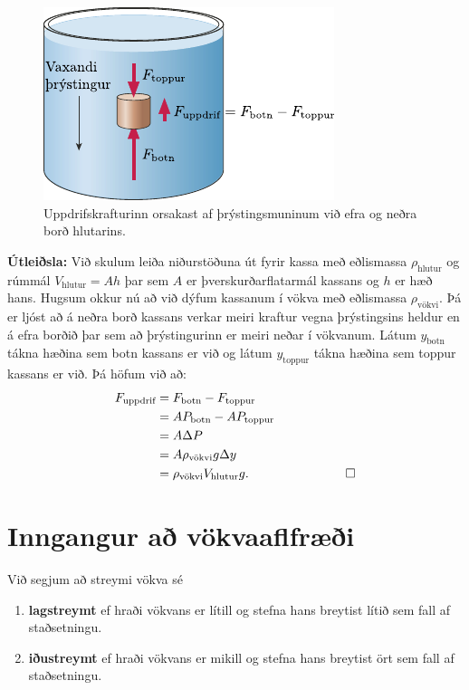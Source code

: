 \ifdefined \wholebook \else\documentclass[oneside]{book}\usepackage{EdlBook}\graphicspath{{figures/}}
\begin{document}
\begin{minipage}{\linewidth}
\begin{figure}
    \centering
    \includegraphics{figures/uppdrif.pdf}
    \caption{Uppdrifskrafturinn orsakast af þrýstingsmuninum við efra og neðra borð hlutarins.}
    \label{fig:uppdrif}
\end{figure}

\textbf{Útleiðsla:} Við skulum leiða niðurstöðuna út fyrir kassa með eðlismassa $\rho_{\text{hlutur}}$ og rúmmál $V_{\text{hlutur}} = Ah$ þar sem $A$ er þverskurðarflatarmál kassans og $h$ er hæð hans. Hugsum okkur nú að við dýfum kassanum í vökva með eðlismassa $\rho_{\text{vökvi}}$. Þá er ljóst að á neðra borð kassans verkar meiri kraftur vegna þrýstingsins heldur en á efra borðið þar sem að þrýstingurinn er meiri neðar í vökvanum. Látum $y_{\text{botn}}$ tákna hæðina sem botn kassans er við og látum $y_{\text{toppur}}$ tákna hæðina sem toppur kassans er við. Þá höfum við að:
\begin{align*}
    F_{\text{uppdrif}} &= F_{\text{botn}} - F_{\text{toppur}} \\
    &= AP_{\text{botn}} - AP_{\text{toppur}} \\
    &= A \Delta P \\
    &= A \rho_{\text{vökvi}}g\Delta y \\
    &= \rho_{\text{vökvi}}V_{\text{hlutur}}g. \hspace{2cm} \qed
\end{align*}
\end{minipage}


\section{Inngangur að vökvaaflfræði}

\begin{tcolorbox}
\begin{definition}
Við segjum að streymi vökva sé
\begin{enumerate}[label = \textbf{(\roman*)}]
    \item \textbf{lagstreymt} ef hraði vökvans er lítill og stefna hans breytist lítið sem fall af staðsetningu.
    \item \textbf{iðustreymt} ef hraði vökvans er mikill og stefna hans breytist ört sem fall af staðsetningu.
\end{enumerate}
\end{definition}
\end{tcolorbox}
\end{document}
